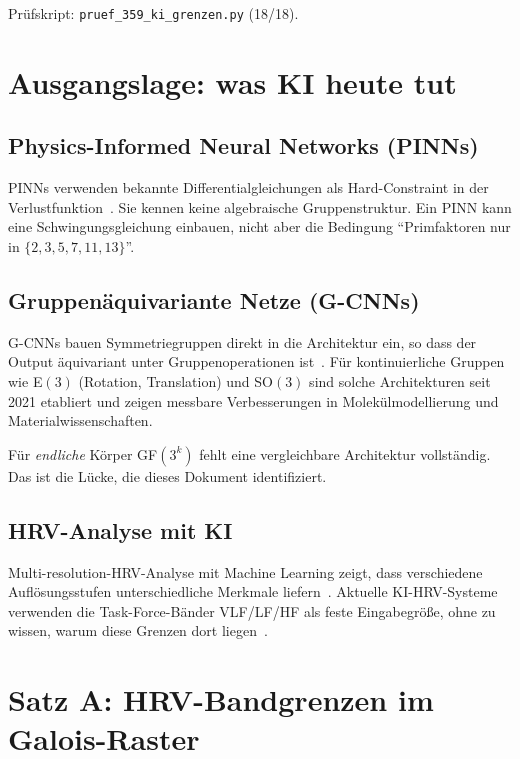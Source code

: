 Prüfskript: \texttt{pruef\_359\_ki\_grenzen.py} (18/18).

\section{Ausgangslage: was KI heute tut}

\subsection*{Physics-Informed Neural Networks (PINNs)}

PINNs verwenden bekannte Differentialgleichungen als Hard-Constraint
in der Verlustfunktion \LM\,\cite{Raissi2024}. Sie kennen keine
algebraische Gruppenstruktur. Ein PINN kann eine Schwingungsgleichung
einbauen, nicht aber die Bedingung ``Primfaktoren nur in
$\{2,3,5,7,11,13\}$''.

\subsection*{Gruppenäquivariante Netze (G-CNNs)}

G-CNNs bauen Symmetriegruppen direkt in die Architektur ein, so dass
der Output äquivariant unter Gruppenoperationen ist \LM\,\cite{Finzi2022}.
Für kontinuierliche Gruppen wie E$(3)$ (Rotation, Translation) und
SO$(3)$ sind solche Architekturen seit 2021 etabliert und zeigen
messbare Verbesserungen in Molekülmodellierung und Materialwissenschaften.

Für \emph{endliche} Körper GF$(3^k)$ fehlt eine vergleichbare Architektur
vollständig. Das ist die Lücke, die dieses Dokument identifiziert.

\subsection*{HRV-Analyse mit KI}

Multi-resolution-HRV-Analyse mit Machine Learning zeigt, dass verschiedene
Auflösungsstufen unterschiedliche Merkmale liefern \LM\,\cite{Gupta2024}. Aktuelle
KI-HRV-Systeme verwenden die Task-Force-Bänder VLF/LF/HF als feste
Eingabegröße, ohne zu wissen, warum diese Grenzen dort liegen
\LM\,\cite{Villanueva2026}.

\section{Satz A: HRV-Bandgrenzen im Galois-Raster}

